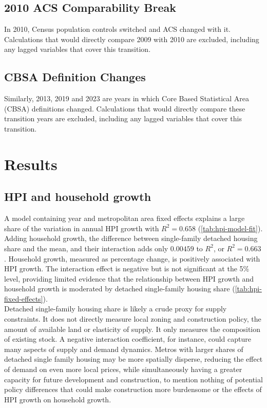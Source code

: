 \documentclass[11pt]{article}
\begin{document}
    \subsection*{2010 ACS Comparability Break}
        In 2010, Census population controls switched and ACS changed with it. Calculations that would directly compare 2009 with 2010 are excluded, including any lagged variables that cover this transition.
    \subsection*{CBSA Definition Changes}
        Similarly, 2013, 2019 and 2023 are years in which Core Based Statistical Area (CBSA) definitions changed. Calculations that would directly compare these transition years are excluded, including any lagged variables that cover this transition.
    \section{Results}
    \subsection*{HPI and household growth}
        A model containing year and metropolitan area fixed effects explains a large share of the variation in annual HPI growth with $R^2 = 0.658$ (\autoref{tab:hpi-model-fit}). Adding household growth, the difference between single-family detached housing share and the mean, and their interaction adds only $0.00459$ to $R^2$, or $R^2 = 0.663$. Household growth, measured as percentage change, is positively associated with HPI growth. The interaction effect is negative but is not significant at the 5\% level, providing limited evidence that the relationship between HPI growth and household growth is moderated by detached single-family housing share (\autoref{tab:hpi-fixed-effects}). \\
        Detached single-family housing share is likely a crude proxy for supply constraints. It does not directly measure local zoning and construction policy, the amount of available land or elasticity of supply. It only measures the composition of existing stock. A negative interaction coefficient, for instance, could capture many aspects of supply and demand dynamics. Metros with larger shares of detached single family housing may be more spatially disperse, reducing the effect of demand on even more local prices, while simultaneously having a greater capacity for future development and construction, to mention nothing of potential policy differences that could make construction more burdensome or the effects of HPI growth on household growth.
\end{document}
